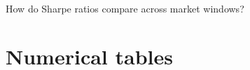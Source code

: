 \documentclass[9pt,aspectratio=169,t]{beamer}
\begin{document}
\begin{frame}[label=qa-sharpe]{How do Sharpe ratios compare across market windows?}
\end{frame}
\endgroup

\section{Numerical tables}
\begingroup
{}
\newcommand{\scaHighlightedCell}[3]{%
  \begingroup\setlength{\fboxsep}{0pt}%
  \colorbox{#1}{\makebox[\linewidth][c]{\color{#2}\strut\(\mathbf{#3}\)}}%
  \endgroup}
\newcommand{\scaRuleBest}[1]{\scaHighlightedCell{bestTint}{titleink}{#1}}
\newcommand{\scaOverallBest}[1]{\scaHighlightedCell{slideaccent}{white}{#1}}
\newcommand{\scaTableLegend}{{\fontsize{6.8}{8.2}\selectfont\color{subtle}
  \scaSwatch{bestTint}\, Best in SCA row\hspace{2.5mm}
  \scaSwatch{slideaccent}\, Best of nine SCA portfolios}}
\newcommand{\pzCells}[4]{\(#1\) & \(#2\) & \(#3\) & \(#4\)}
\newcommand{\pzBoldCells}[4]{\(\mathbf{#1}\) & \(\mathbf{#2}\) & \(\mathbf{#3}\) & \(\mathbf{#4}\)}
\newcommand{\pzGrowthPCells}[4]{{\color{titleink}\(\mathbf{#1}\)} & {\color{subtle}\(#2\)}
                               & {\color{titleink}\(\mathbf{#3}\)} & {\color{subtle}\(#4\)}}
\newcommand{\fullSampleTableRow}[6]{#2 & #3 & #4 & #5 & #6\\}
\end{document}
